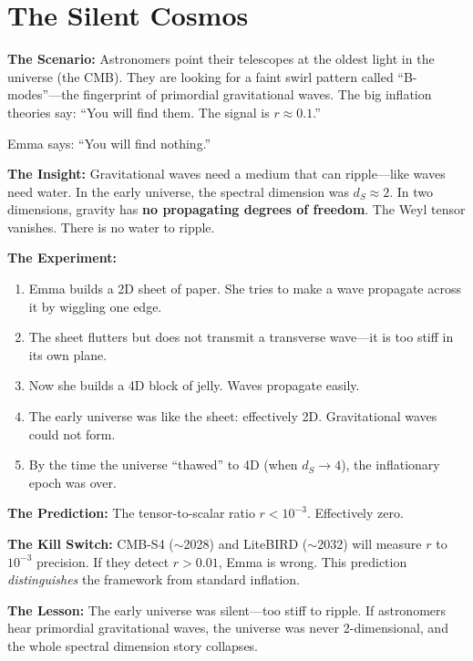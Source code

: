 \documentclass[11pt, a4paper, openany]{book}
\begin{document}
\section{The Silent Cosmos}
\begin{thoughtexp}
\textbf{The Scenario:} Astronomers point their telescopes at the oldest light in the universe (the CMB). They are looking for a faint swirl pattern called ``B-modes''---the fingerprint of primordial gravitational waves. The big inflation theories say: ``You will find them. The signal is $r \approx 0.1$.''

Emma says: ``You will find nothing.''

\textbf{The Insight:} Gravitational waves need a medium that can ripple---like waves need water. In the early universe, the spectral dimension was $d_S \approx 2$. In two dimensions, gravity has \textbf{no propagating degrees of freedom}. The Weyl tensor vanishes. There is no water to ripple.

\textbf{The Experiment:}
\begin{enumerate}
  \item Emma builds a 2D sheet of paper. She tries to make a wave propagate across it by wiggling one edge.
  \item The sheet flutters but does not transmit a transverse wave---it is too stiff in its own plane.
  \item Now she builds a 4D block of jelly. Waves propagate easily.
  \item The early universe was like the sheet: effectively 2D. Gravitational waves could not form.
  \item By the time the universe ``thawed'' to 4D (when $d_S \to 4$), the inflationary epoch was over.
\end{enumerate}

\textbf{The Prediction:} The tensor-to-scalar ratio $r < 10^{-3}$. Effectively zero.

\textbf{The Kill Switch:} CMB-S4 ($\sim$2028) and LiteBIRD ($\sim$2032) will measure $r$ to $10^{-3}$ precision. If they detect $r > 0.01$, Emma is wrong. This prediction \emph{distinguishes} the framework from standard inflation.

\textbf{The Lesson:} The early universe was silent---too stiff to ripple. If astronomers hear primordial gravitational waves, the universe was never 2-dimensional, and the whole spectral dimension story collapses.
\end{thoughtexp}
\end{document}
